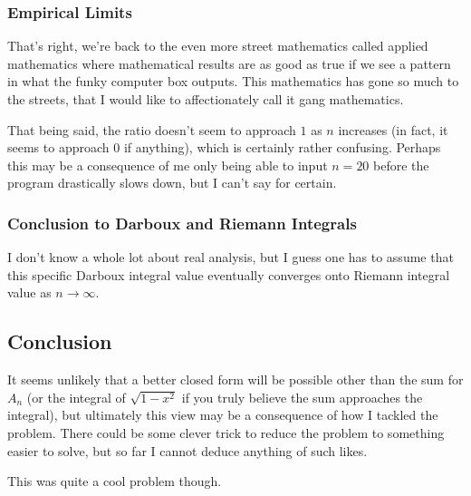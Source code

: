 \documentclass{article}
\begin{document}
\subsubsection*{Empirical Limits}

That's right, we're back to the even more street mathematics called applied
mathematics where mathematical results are as good as true if we see a pattern
in what the funky computer box outputs. This mathematics has gone so much to
the streets, that I would like to affectionately call it gang mathematics.

That being said, the ratio doesn't seem to approach \( 1 \) as \( n \)
increases (in fact, it seems to approach \( 0 \) if anything), which is
certainly rather confusing. Perhaps this may be a consequence of me only being
able to input \( n = 20 \) before the program drastically slows down, but I
can't say for certain.

\subsubsection*{Conclusion to Darboux and Riemann Integrals}

I don't know a whole lot about real analysis, but I guess one has to assume
that this specific Darboux integral value eventually converges onto Riemann
integral value as \( n \to \infty \).

\subsection*{Conclusion}

It seems unlikely that a better closed form will be possible other than the sum
for \( A_n \) (or the integral of \( \sqrt{1-x^2} \) if you truly believe the
sum approaches the integral), but ultimately this view may be a consequence of
how I tackled the problem. There could be some clever trick to reduce the
problem to something easier to solve, but so far I cannot deduce anything of
such likes.

This was quite a cool problem though.
\end{document}
